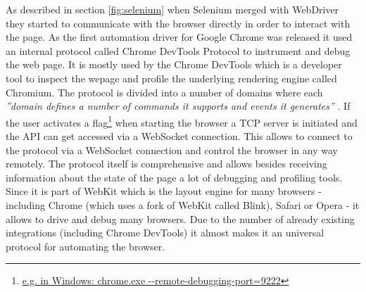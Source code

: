 As described in section \ref{fig:selenium} when Selenium merged with WebDriver they started
to communicate with the browser directly in order to interact with the page. As the first
automation driver for Google Chrome was released it used an internal protocol called Chrome
DevTools Protocol to instrument and debug the web page. It is mostly used by the Chrome
DevTools which is a developer tool to inspect the wepage and profile the underlying rendering
engine called Chromium. The protocol is divided into a number of domains where each
\textit{''domain defines a number of commands it supports and events it generates''}
\cite{devtoolsprotocol}. If the user activates a flag\footnote{\url{e.g. in Windows:
chrome.exe --remote-debugging-port=9222}} when starting the browser a TCP server is initiated
and the API can get accessed via a WebSocket connection. This allows to connect to the
protocol via a WebSocket connection and control the browser in any way remotely. The protocol
itself is comprehensive and allows besides receiving information about the state of the page
a lot of debugging and profiling tools. Since it is part of WebKit which is the layout engine
for many browsers - including Chrome (which uses a fork of WebKit called Blink), Safari or
Opera - it allows to drive and debug many browsers. Due to the number of already existing
integrations (including Chrome DevTools) it almost makes it an universal protocol for
automating the browser.
